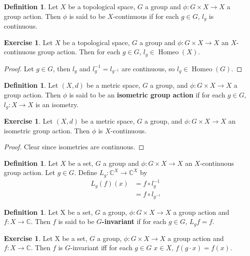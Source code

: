 \documentclass[12pt]{amsart}
\theoremstyle{definition}
\newtheorem{defn}[definition]{Definition}
\newtheorem{ex}[definition]{Exercise}
\newcommand{\C}{\mathbb{C}}
\DeclareMathOperator{\Homeo}{Homeo}
\newcommand{\ld}[1]{\label{defn:#1}}
\begin{document}
	\begin{defn}
	Let $X$ be a topological space, $G$ a group and $\phi: G \times X \rightarrow X$ a group action. Then $\phi$ is said to be $X$-continuous if for each $g \in G$, $l_g$ is continuous.
	\end{defn}
	
	\begin{ex}
	Let $X$ be a topological space, $G$ a group and $\phi: G \times X \rightarrow X$ an $X$-continuous group action. Then for each $g \in G$, $l_g \in \Homeo(X)$.
	\end{ex}
	
	\begin{proof}
	Let $g \in G$, then $l_g$ and $l_{g}^{-1} = l_{g^{-1}}$ are continuous, so $l_g \in \Homeo(G)$. 
	\end{proof}
	
	\begin{defn} \ld{}
	Let $(X, d)$ be a metric space, $G$ a group, and $\phi: G \times X \rightarrow X$ a group action. Then $\phi$ is said to be an \textbf{isometric group action} if for each $g \in G$, $l_g:X \rightarrow X$ is an isometry. 
	\end{defn}
	
	\begin{ex}
	Let $(X, d)$ be a metric space, $G$ a group, and $\phi: G \times X \rightarrow X$ an isometric group action. Then $\phi$ is $X$-continuous.
	\end{ex}
	
	\begin{proof}
	Clear since isometries are continuous.
\end{proof}		
	
	\begin{defn}
	Let $X$ be a set, $G$ a group and $\phi: G \times X \rightarrow X$ an $X$-continuous group action. Let $g \in G$. Define $L_g:\C^X \rightarrow \C^X$ by 
	\begin{align*}
	L_g(f)(x) 
	&= f \circ l_g^{-1} \\
	&= f \circ l_{g^{-1}}
	\end{align*}
	\end{defn}
	
	
	\begin{defn}
	Let X be a set, $G$ a group, $\phi: G \times X \rightarrow X$ a group action and $f:X \rightarrow \C$. Then $f$ is said to be \textbf{$G$-invariant} if for each $g \in G$, $L_g f = f$.
	\end{defn}
	
	\begin{ex}
	Let X be a set, $G$ a group, $\phi: G \times X \rightarrow X$ a group action and $f:X \rightarrow \C$. Then $f$ is $G$-invariant iff for each $g \in G$ $x \in X$, $f(g \cdot x) = f(x)$.  
	\end{ex}
	
\end{document}
